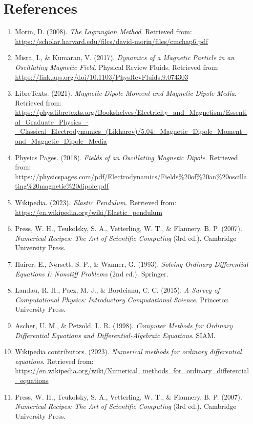 \documentclass[12pt]{article}
\begin{document}
\newpage

\section*{References}
\begin{enumerate}
    \item Morin, D. (2008). \textit{The Lagrangian Method}. Retrieved from: \url{https://scholar.harvard.edu/files/david-morin/files/cmchap6.pdf}
    \item Misra, I., \& Kumaran, V. (2017). \textit{Dynamics of a Magnetic Particle in an Oscillating Magnetic Field}. Physical Review Fluids. Retrieved from: \url{https://link.aps.org/doi/10.1103/PhysRevFluids.9.074303}
    \item LibreTexts. (2021). \textit{Magnetic Dipole Moment and Magnetic Dipole Media}. Retrieved from: \url{https://phys.libretexts.org/Bookshelves/Electricity_and_Magnetism/Essential_Graduate_Physics_-_Classical_Electrodynamics_(Likharev)/5.04:_Magnetic_Dipole_Moment_and_Magnetic_Dipole_Media}
    \item Physics Pages. (2018). \textit{Fields of an Oscillating Magnetic Dipole}. Retrieved from: \url{https://physicspages.com/pdf/Electrodynamics/Fields%20of%20an%20oscillating%20magnetic%20dipole.pdf}
    \item Wikipedia. (2023). \textit{Elastic Pendulum}. Retrieved from: \url{https://en.wikipedia.org/wiki/Elastic_pendulum}
    \item Press, W. H., Teukolsky, S. A., Vetterling, W. T., \& Flannery, B. P. (2007). \textit{Numerical Recipes: The Art of Scientific Computing} (3rd ed.). Cambridge University Press.
    \item Hairer, E., Nørsett, S. P., \& Wanner, G. (1993). \textit{Solving Ordinary Differential Equations I: Nonstiff Problems} (2nd ed.). Springer.
    \item Landau, R. H., Paez, M. J., \& Bordeianu, C. C. (2015). \textit{A Survey of Computational Physics: Introductory Computational Science}. Princeton University Press.
    \item Ascher, U. M., \& Petzold, L. R. (1998). \textit{Computer Methods for Ordinary Differential Equations and Differential-Algebraic Equations}. SIAM.
    \item Wikipedia contributors. (2023). \textit{Numerical methods for ordinary differential equations}. Retrieved from: \url{https://en.wikipedia.org/wiki/Numerical_methods_for_ordinary_differential_equations}
     \item Press, W. H., Teukolsky, S. A., Vetterling, W. T., \& Flannery, B. P. (2007). \textit{Numerical Recipes: The Art of Scientific Computing} (3rd ed.). Cambridge University Press.

\end{enumerate}
\end{document}

